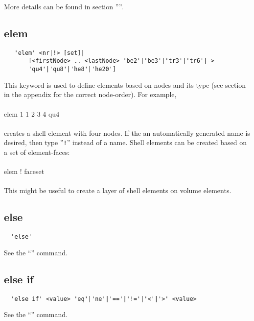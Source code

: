 \documentclass{article}
\begin{document}
More details can be found in section ''''.

\subsection{\label{elem}elem}
\begin{verbatim}
   'elem' <nr|!> [set]|
       [<firstNode> .. <lastNode> 'be2'|'be3'|'tr3'|'tr6'|->
       'qu4'|'qu8'|'he8'|'he20']
\end{verbatim}
This keyword is used to define elements based on nodes and its type (see section  in the appendix for the correct node-order). For example,\\\\
elem 1 1 2 3 4 qu4\\\\creates a shell element with four nodes. If the an automatically generated name is desired, then type ''\verb_!_'' instead of a name. Shell elements can be created based on a set of element-faces:\\\\elem ! faceset\\\\This might be useful to create a layer of shell elements on volume elements. 

\subsection{\label{else}else}
\begin{verbatim}
  'else'
\end{verbatim}
See the ``'' command.

\subsection{\label{else if}else if}
\begin{verbatim}
  'else if' <value> 'eq'|'ne'|'=='|'!='|'<'|'>' <value>
\end{verbatim}
See the ``'' command.
\end{document}
